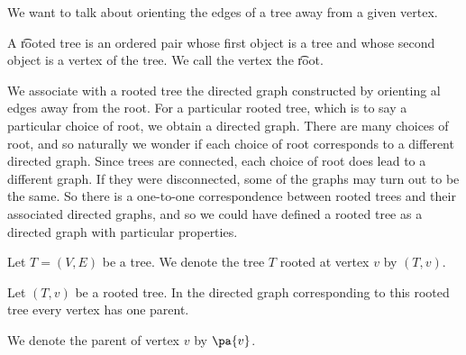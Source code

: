 

We want to talk about orienting the edges of a tree away from a given vertex.


A \t{rooted tree} is an ordered pair whose first object is a tree and whose second object is a vertex of the tree. We call the vertex the \t{root}.

We associate with a rooted tree the directed graph constructed by orienting al edges away from the root.
For a particular rooted tree, which is to say a particular choice of root, we obtain a directed graph.
There are many choices of root, and so naturally we wonder if each choice of root corresponds to a different directed graph.
Since trees are connected, each choice of root does lead to a different graph.
If they were disconnected, some of the graphs may turn out to be the same.
So there is a one-to-one correspondence between rooted trees and their associated directed graphs, and so we could have defined a rooted tree as a directed graph with particular properties.


Let $T = (V, E)$ be a tree.
We denote the tree $T$ rooted at vertex $v$ by $(T, v)$.


\begin{prop}
Let $(T, v)$ be a rooted tree.
In the directed graph corresponding to this rooted tree every vertex has one parent.
\end{prop}

We denote the parent of vertex $v$ by $\pa{v}$.
